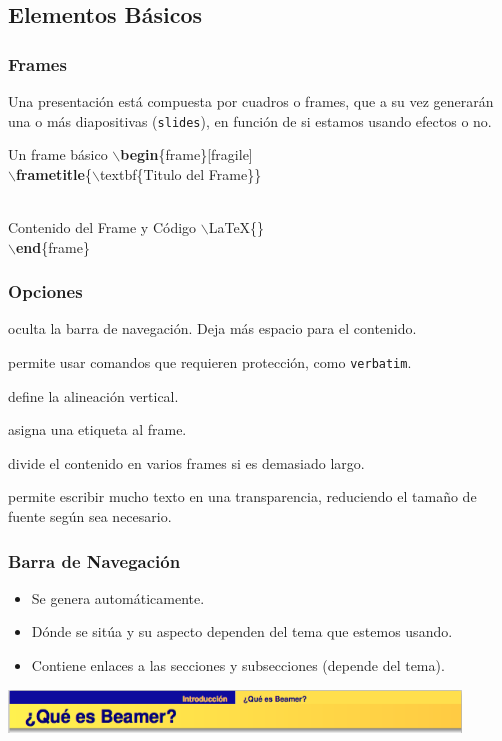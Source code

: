 \documentclass[aspectratio=43]{beamer}%
\begin{document}
\subsection{Elementos Básicos}
\begin{frame}[fragile]
\frametitle{\textbf{Frames}}
\justifying
 Una presentación está compuesta por cuadros o frames, que a su vez generarán una o más diapositivas (\texttt{slides}), en función de si estamos usando efectos o no.
 
 \begin{exampleblock}{Un frame básico}
$\backslash$\textbf{begin}\{frame\}[fragile]\\
$\backslash$\textbf{frametitle}\{$\backslash$textbf\{Titulo del Frame\}\}\\\

 Contenido del Frame y Código $\backslash$LaTeX\{\}\\
$\backslash$\textbf{end}\{frame\}
\end{exampleblock}

 
\end{frame}

\begin{frame}[fragile]
\frametitle{\textbf{Opciones}}
\justifying
 
 \begin{description}\justifying
  \item [plain] oculta la barra de navegación. Deja más espacio para el contenido.
  \item [fragile] permite usar comandos que requieren protección, como \texttt{verbatim}.
  \item [b, c, t] define la alineación vertical.
  \item [label=nombre] asigna una etiqueta al frame.
  \item [allowframebreaks] divide el contenido en varios frames si es demasiado largo.
  \item [shrink] permite escribir mucho texto en una transparencia, reduciendo el tamaño de fuente según sea necesario.
\end{description}

 
\end{frame}

 \begin{frame}[fragile]
\frametitle{\textbf{Barra de Navegación}}
\justifying
 \begin{itemize}\justifying
  \item Se genera automáticamente.
  \item Dónde se sitúa y su aspecto dependen del tema que estemos usando.
  \item Contiene enlaces a las secciones y subsecciones (depende del tema).
\end{itemize}
\begin{center}
\includegraphics[width=12cm]{images/barra}
\end{center}

\end{frame}
\end{document}
